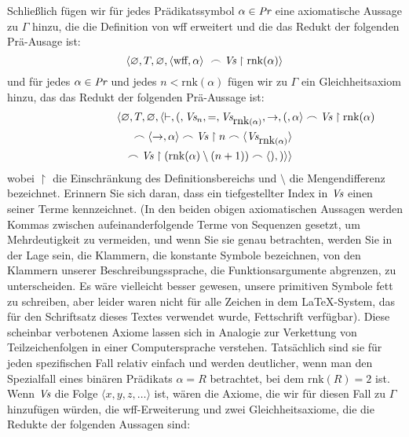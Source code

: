 Schließlich fügen wir für jedes Prädikatssymbol $\alpha\in \mbox{\em Pr}$ eine axiomatische Aussage zu $\Gamma$ hinzu, die die Definition von wff erweitert und die das Redukt der folgenden Prä-Ausage ist:
\begin{displaymath}
    \langle\varnothing,T,\varnothing,
            \langle \mbox{wff},\alpha\rangle\
            \frown \mbox{\em Vs}\restriction\mbox{rnk}(\alpha)\rangle
\end{displaymath}
und für jedes $\alpha\in \mbox{\em Pr}$ und jedes $n < \mbox{rnk}(\alpha)$ fügen wir zu $\Gamma$ ein Gleichheitsaxiom hinzu, das das Redukt der folgenden Prä-Aussage ist:
\begin{eqnarray*}
    \lefteqn{\langle\varnothing,T,\varnothing,
            \langle
      \vdash,(,\mbox{\em Vs}_n,=,\mbox{\em Vs}_{\mbox{rnk}(\alpha)},\to,
            (,\alpha\rangle\frown \mbox{\em Vs}\restriction\mbox{rnk}(\alpha)} \\
  & & \frown
            \langle\to,\alpha\rangle\frown \mbox{\em Vs}\restriction n\frown
            \langle \mbox{\em Vs}_{\mbox{rnk}(\alpha)}\rangle \\
 & & \frown
            \mbox{\em Vs}\restriction(\mbox{rnk}(\alpha)\setminus(n+1))\frown
            \langle),)\rangle\rangle
\end{eqnarray*}
wobei $\restriction$ die Einschränkung des Definitionsbereichs und $\setminus$ die Mengendifferenz bezeichnet.  Erinnern Sie sich daran, dass ein tiefgestellter Index in $\mbox{\em Vs}$ einen seiner Terme kennzeichnet.  (In den beiden obigen axiomatischen Aussagen werden Kommas zwischen aufeinanderfolgende Terme von Sequenzen gesetzt, um Mehrdeutigkeit zu vermeiden, und wenn Sie sie genau betrachten, werden Sie in der Lage sein, die Klammern, die konstante Symbole bezeichnen, von den Klammern unserer Beschreibungssprache, die Funktionsargumente abgrenzen, zu unterscheiden.  Es wäre vielleicht besser gewesen, unsere primitiven Symbole fett zu schreiben, aber leider waren nicht für alle Zeichen in dem \LaTeX-System, das für den Schriftsatz dieses Textes verwendet wurde, Fettschrift verfügbar).  Diese scheinbar verbotenen Axiome lassen sich in Analogie zur Verkettung von Teilzeichenfolgen in einer Computersprache verstehen.  Tatsächlich sind sie für jeden spezifischen Fall relativ einfach und werden deutlicher, wenn man den Spezialfall eines binären Prädikats $\alpha = R$ betrachtet, bei dem $\mbox{rnk}(R)=2$ ist.  Wenn $\mbox{\em Vs}$ die Folge $\langle x,y,z,\ldots\rangle$ ist, wären die Axiome, die wir für diesen Fall zu $\Gamma$ hinzufügen würden, die wff-Erweiterung und zwei Gleichheitsaxiome, die die Redukte der folgenden Aussagen sind:
